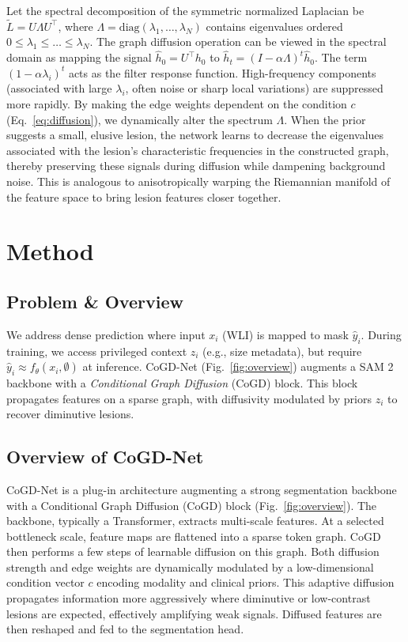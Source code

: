 \documentclass{article}
\begin{document}
Let the spectral decomposition of the symmetric normalized Laplacian be $\widetilde{L} = U \Lambda U^\top$, where $\Lambda = \text{diag}(\lambda_1, \dots, \lambda_N)$ contains eigenvalues ordered $0 \le \lambda_1 \le \dots \le \lambda_N$. The graph diffusion operation can be viewed in the spectral domain as mapping the signal $\hat{h}_0 = U^\top h_0$ to $\hat{h}_t = (I - \alpha \Lambda)^t \hat{h}_0$. The term $(1 - \alpha \lambda_i)^t$ acts as the filter response function. High-frequency components (associated with large $\lambda_i$, often noise or sharp local variations) are suppressed more rapidly.
By making the edge weights dependent on the condition $c$ (Eq.~\ref{eq:diffusion}), we dynamically alter the spectrum $\Lambda$. When the prior suggests a small, elusive lesion, the network learns to decrease the eigenvalues associated with the lesion's characteristic frequencies in the constructed graph, thereby preserving these signals during diffusion while dampening background noise. This is analogous to anisotropically warping the Riemannian manifold of the feature space to bring lesion features closer together.

\section{Method}

\subsection{Problem \& Overview} 
We address dense prediction where input $x_i$ (WLI) is mapped to mask $\hat{y}_i$. During training, we access privileged context $z_i$ (e.g., size metadata), but require $\hat{y}_i \approx f_\theta(x_i, \emptyset)$ at inference. CoGD-Net (Fig.~\ref{fig:overview}) augments a SAM 2 backbone with a \emph{Conditional Graph Diffusion} (CoGD) block. This block propagates features on a sparse graph, with diffusivity modulated by priors $z_i$ to recover diminutive lesions.

\subsection{Overview of CoGD-Net}
\label{subsec:overview}
CoGD-Net is a plug-in architecture augmenting a strong segmentation backbone with a Conditional Graph Diffusion (CoGD) block (Fig.~\ref{fig:overview}). The backbone, typically a Transformer, extracts multi-scale features. At a selected bottleneck scale, feature maps are flattened into a sparse token graph. CoGD then performs a few steps of learnable diffusion on this graph. Both diffusion strength and edge weights are dynamically modulated by a low-dimensional condition vector $c$ encoding modality and clinical priors. This adaptive diffusion propagates information more aggressively where diminutive or low-contrast lesions are expected, effectively amplifying weak signals. Diffused features are then reshaped and fed to the segmentation head.
\end{document}
